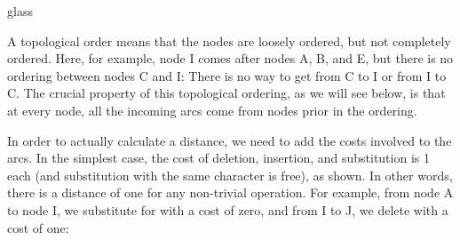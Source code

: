 \begin{tblsfilledsymbol}{}{glass}
\begin{underthehood}
\begin{center}
  \end{center}\unskip

A topological order means that the nodes are loosely ordered, but not
completely ordered.  Here, for example, node
I comes after nodes A, B, and E, but there is no ordering between
nodes C and I: There is no way to get from C to I or from I to C.  The
crucial property of this topological ordering, as we will see below,
is that at every node, all the incoming arcs come from nodes prior in
the ordering.

In order to actually calculate a distance, we need to add the costs
involved to the arcs.  In the simplest case, the cost of deletion,
insertion, and substitution is 1 each (and substitution with the same
character is free), as shown.  In other
words, there is a distance of one for any non-trivial operation.  For
example, from node A to node I, we substitute  for
 with a cost of zero, and from I to J, we delete 
with a cost of one:


\end{underthehood}
\end{tblsfilledsymbol}
